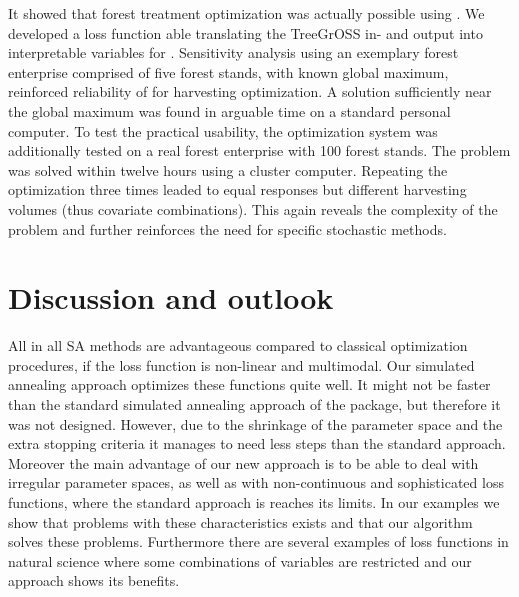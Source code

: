 It showed that forest treatment optimization was actually possible using . We developed a loss function able translating the TreeGrOSS in- and output into interpretable variables for . Sensitivity analysis using an exemplary forest enterprise comprised of five forest stands, with known global maximum, reinforced reliability of  for harvesting optimization. A solution sufficiently near the global maximum was found in arguable time on a standard personal computer. To test the practical usability, the optimization system was additionally tested on a real forest enterprise with 100 forest stands. The problem was solved within twelve hours using a cluster computer. Repeating the optimization three times leaded to equal responses but different harvesting volumes (thus covariate combinations). This again reveals the complexity of the problem and further reinforces the need for specific stochastic methods.

\section{Discussion and outlook}
All in all SA methods are advantageous compared to classical optimization procedures, if the loss function is non-linear and multimodal. Our simulated annealing approach optimizes these functions quite well. It might not be faster than the standard simulated annealing approach of the  package, but therefore it was not designed. However, due to the shrinkage of the parameter space and the extra stopping criteria it manages to need less steps than the standard approach. Moreover the main advantage of our new approach is to be able to deal with irregular parameter spaces, as well as with non-continuous and sophisticated loss functions, where the standard approach is reaches its limits. In our examples we show that problems with these characteristics exists and that our algorithm solves these problems. Furthermore there are several examples of loss functions in natural science where some combinations of variables are restricted and our approach shows its benefits.



\address{Author One\\
    Affiliation\\
    Address\\
    Country\\}

\address{Author Two\\
    Affiliation\\
    Address\\
    Country\\}

\address{Author Three\\
    Affiliation\\
    Address\\
    Country\\}
